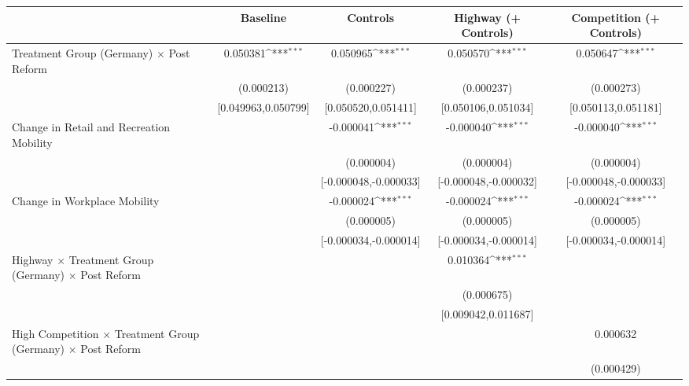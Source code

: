 {
\def\sym#1{\ifmmode^{#1}\else\(^{#1}\)\fi}
\begin{tabular}{l*{4}{c}}
\toprule
                    &\multicolumn{1}{c}{Baseline}&\multicolumn{1}{c}{Controls}&\multicolumn{1}{c}{Highway (+ Controls)}&\multicolumn{1}{c}{Competition (+ Controls)}\\
\midrule
Treatment Group (Germany) $\times$ Post Reform&    0.050381\sym{***}&    0.050965\sym{***}&    0.050570\sym{***}&    0.050647\sym{***}\\
                    &  (0.000213)         &  (0.000227)         &  (0.000237)         &  (0.000273)         \\
                    &[0.049963,0.050799]         &[0.050520,0.051411]         &[0.050106,0.051034]         &[0.050113,0.051181]         \\
Change in Retail and Recreation Mobility&                     &   -0.000041\sym{***}&   -0.000040\sym{***}&   -0.000040\sym{***}\\
                    &                     &  (0.000004)         &  (0.000004)         &  (0.000004)         \\
                    &                     &[-0.000048,-0.000033]         &[-0.000048,-0.000032]         &[-0.000048,-0.000033]         \\
Change in Workplace Mobility&                     &   -0.000024\sym{***}&   -0.000024\sym{***}&   -0.000024\sym{***}\\
                    &                     &  (0.000005)         &  (0.000005)         &  (0.000005)         \\
                    &                     &[-0.000034,-0.000014]         &[-0.000034,-0.000014]         &[-0.000034,-0.000014]         \\
Highway $\times$ Treatment Group (Germany) $\times$ Post Reform&                     &                     &    0.010364\sym{***}&                     \\
                    &                     &                     &  (0.000675)         &                     \\
                    &                     &                     &[0.009042,0.011687]         &                     \\
High Competition $\times$ Treatment Group (Germany) $\times$ Post Reform&                     &                     &                     &    0.000632         \\
                    &                     &                     &                     &  (0.000429)         \\

\end{tabular}}
